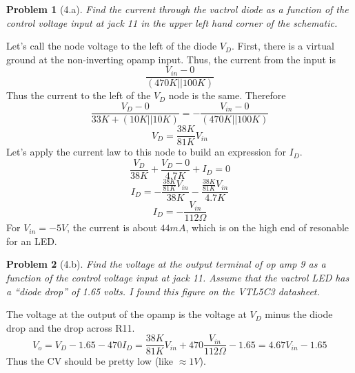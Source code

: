 \documentclass[12pt]{article}
\providecommand{\ohm}[0]{\ensuremath{\Omega}}
\newtheorem*{prob}{Problem}
\begin{document}
\begin{prob}[4.a]{
Find the current through the vactrol diode as a function of the control voltage input at jack 11 in the upper left hand corner of the schematic.
}\end{prob}
Let's call the node voltage to the left of the diode $V_D$. First, there is a virtual ground at the non-inverting opamp input. Thus, the current from the input is 
\[\frac{V_{in}-0}{(470K||100K)}\]
Thus the current to the left of the $V_D$ node is the same. Therefore
\[\frac{V_D-0}{33K+(10K||10K)} = -\frac{V_{in}-0}{(470K||100K)} \]
\[ V_D = \frac{38K}{81K}V_{in} \]
Let's apply the current law to this node to build an expression for $I_D$.
\[ \frac{V_D}{38K} + \frac{V_D-0}{4.7K} + I_D = 0 \]
\[I_D = -\frac{\frac{38K}{81K}V_{in}}{38K} -\frac{\frac{38K}{81K}V_{in}}{4.7K} \]
\[I_D = -\frac{V_{in}}{112\ohm}\]
For $V_{in} = -5V$, the current is about $44mA$, which is on the high end of resonable for an LED. 

\begin{prob}[4.b]{
  Find the voltage at the output terminal of op amp 9 as a function of the control voltage input at jack 11. Assume that the vactrol LED has a ``diode drop'' of 1.65 volts. I found this figure on the VTL5C3 datasheet.
}\end{prob}
The voltage at the output of the opamp is the voltage at $V_D$ minus the diode drop and the drop across R11.
\[V_o = V_D - 1.65 - 470I_D = \frac{38K}{81K}V_{in} + 470\frac{V_{in}}{112\ohm} - 1.65 = 4.67V_{in}-1.65\]
Thus the CV should be pretty low (like $\approx 1V$).
\end{document}
